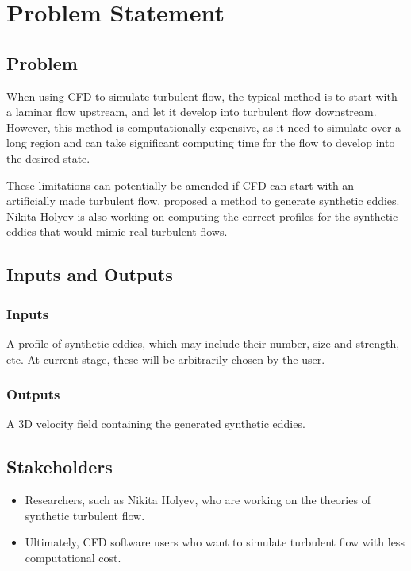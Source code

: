 \documentclass{article}
\begin{document}
\section{Problem Statement}

\subsection{Problem}
When using CFD to simulate turbulent flow, the typical method is to start with a laminar flow upstream, and let it develop into turbulent flow downstream. However, this method is computationally expensive, as it need to simulate over a long region and can take significant computing time for the flow to develop into the desired state. 

These limitations can potentially be amended if CFD can start with an artificially made turbulent flow. \citet{PolettoEtAl2013} proposed a method to generate synthetic eddies. Nikita Holyev is also working on computing the correct profiles for the synthetic eddies that would mimic real turbulent flows.


\subsection{Inputs and Outputs}

\subsubsection{Inputs}
A profile of synthetic eddies, which may include their number, size and strength, etc. At current stage, these will be arbitrarily chosen by the user.

\subsubsection{Outputs}
A 3D velocity field containing the generated synthetic eddies.

\subsection{Stakeholders}
\begin{itemize}
    \item Researchers, such as Nikita Holyev, who are working on the theories of synthetic turbulent flow.
    \item Ultimately, CFD software users who want to simulate turbulent flow with less computational cost.
\end{itemize}
\end{document}
